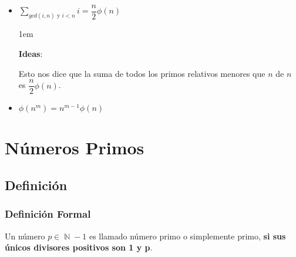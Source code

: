 \documentclass[12pt, fleqn]{report}                             %
\newenvironment{SmallIndentation}[1][0.75em]                    %
    {\begin{adjustwidth}{#1}{}\begin{footnotesize}}                 %
    {\end{footnotesize}\end{adjustwidth}}                           %
\DeclareMathOperator \Naturals  {\mathbb{N}}                     %
\begin{document}
\begin{itemize}
                \item $\sum_{gcd(i, n) \text{ y } i < n} i = \dfrac{n}{2} \phi(n)$
                    \begin{SmallIndentation}[1em]
                        \textbf{Ideas}:

                        Esto nos dice que la suma de todos los primos relativos menores que
                        $n$ de $n$ es $\dfrac{n}{2} \phi(n)$.

                    \end{SmallIndentation}

                \item $\phi(n^m) = n^{m-1} \phi(n)$

                \clearpage

                

            \end{itemize}






\chapter{Números Primos}
    \clearpage

     

    \clearpage
    \section{Definición}

        \subsection*{Definición Formal}

            Un número $p \in \Naturals - {1}$ es llamado número primo o simplemente
            primo, \textbf{si sus únicos divisores positivos son 1 y p}.
\end{document}
